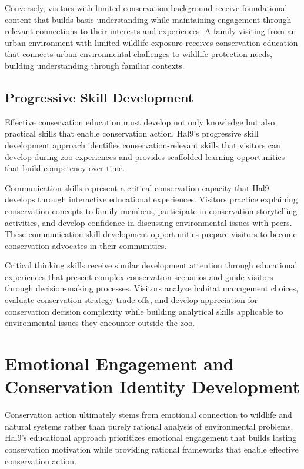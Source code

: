 \documentclass[
  Letterpaper,
]{scrbook}
\begin{document}
Conversely, visitors with limited conservation background receive
foundational content that builds basic understanding while maintaining
engagement through relevant connections to their interests and
experiences. A family visiting from an urban environment with limited
wildlife exposure receives conservation education that connects urban
environmental challenges to wildlife protection needs, building
understanding through familiar contexts.

\subsection{Progressive Skill
Development}\label{progressive-skill-development}

Effective conservation education must develop not only knowledge but
also practical skills that enable conservation action. Hal9's
progressive skill development approach identifies conservation-relevant
skills that visitors can develop during zoo experiences and provides
scaffolded learning opportunities that build competency over time.

Communication skills represent a critical conservation capacity that
Hal9 develops through interactive educational experiences. Visitors
practice explaining conservation concepts to family members, participate
in conservation storytelling activities, and develop confidence in
discussing environmental issues with peers. These communication skill
development opportunities prepare visitors to become conservation
advocates in their communities.

Critical thinking skills receive similar development attention through
educational experiences that present complex conservation scenarios and
guide visitors through decision-making processes. Visitors analyze
habitat management choices, evaluate conservation strategy trade-offs,
and develop appreciation for conservation decision complexity while
building analytical skills applicable to environmental issues they
encounter outside the zoo.

\section{Emotional Engagement and Conservation Identity
Development}\label{emotional-engagement-and-conservation-identity-development}

Conservation action ultimately stems from emotional connection to
wildlife and natural systems rather than purely rational analysis of
environmental problems. Hal9's educational approach prioritizes
emotional engagement that builds lasting conservation motivation while
providing rational frameworks that enable effective conservation action.
\end{document}
